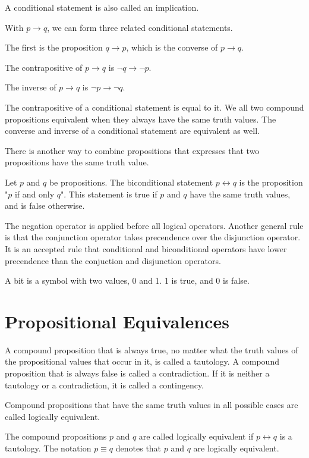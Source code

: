 \documentclass[../discrete.tex]{subfiles}
\begin{document}
A conditional statement is also called an implication.

With $p\rightarrow q$, we can form three related conditional statements. 

The first is the proposition $q\rightarrow p$, which is the converse of $p\rightarrow q$. 

The contrapositive of $p\rightarrow q$ is $\neg q\rightarrow \neg p$.

The inverse of $p\rightarrow q$ is $\neg p \rightarrow \neg q$.

The contrapositive of a conditional statement is equal to it. We all two compound propositions 
equivalent when they always have the same truth values. The converse and inverse of a conditional 
statement are equivalent as well.

There is another way to combine propositions that expresses that two propositions have the same truth value.
\begin{definition}
    Let $p$ and $q$ be propositions. The biconditional statement $p\leftrightarrow q$ 
    is the proposition "$p$ if and only $q$". This statement is true if $p$ and $q$ have 
    the same truth values, and is false otherwise.
\end{definition}

The negation operator is applied before all logical operators. Another general rule is 
that the conjunction operator takes precendence over the disjunction operator. It is an accepted 
rule that conditional and biconditional operators have lower precendence than the conjuction and disjunction operators. 

A bit is a symbol with two values, 0 and 1. 1 is true, and 0 is false. 

\section{Propositional Equivalences}
\begin{definition}
    A compound proposition that is always true, no matter what the truth values of the 
    propositional values that occur in it, is called a tautology. A compound proposition that is 
    always false is called a contradiction. If it is neither a tautology or a contradiction, it is called a contingency.
\end{definition}

Compound propositions that have the same truth values in all possible cases are called logically equivalent. 
\begin{definition}
    The compound propositions $p$ and $q$ are called logically equivalent if $p\leftrightarrow q$ is a 
    tautology. The notation $p\equiv q$ denotes that $p$ and $q$ are logically equivalent.
\end{definition}
\end{document}
